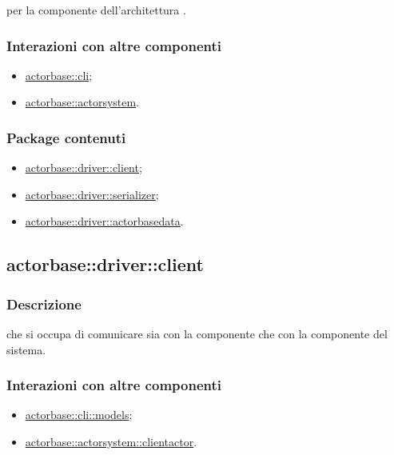\documentclass{scalatekids-article}
\begin{document}
 per la componente  dell'architettura
.

\subsubsection{Interazioni con altre componenti}

\begin{itemize}
\item \hyperref[sec:actorbase::cli]{actorbase::cli};
\item \hyperref[sec:actorbase::actorsystem]{actorbase::actorsystem}.
\end{itemize}

\subsubsection{Package contenuti}

\begin{itemize}
\item \hyperref[sec:actorbase::driver::client]{actorbase::driver::client};
\item \hyperref[sec:actorbase::driver::serializer]{actorbase::driver::serializer};
\item \hyperref[sec:actorbase::driver::actorbasedata]{actorbase::driver::actorbasedata}.
\end{itemize}

\subsection{actorbase::driver::client}
\label{sec:actorbase::driver::client}

\subsubsection{Descrizione}

 che si occupa di comunicare sia con la componente 
che con la componente  del sistema.

\subsubsection{Interazioni con altre componenti}

\begin{itemize}
\item \hyperref[sec:actorbase::cli::models]{actorbase::cli::models};
\item \hyperref[sec:actorbase::actorsystem::clientactor]{actorbase::actorsystem::clientactor}.
\end{itemize}
\end{document}
